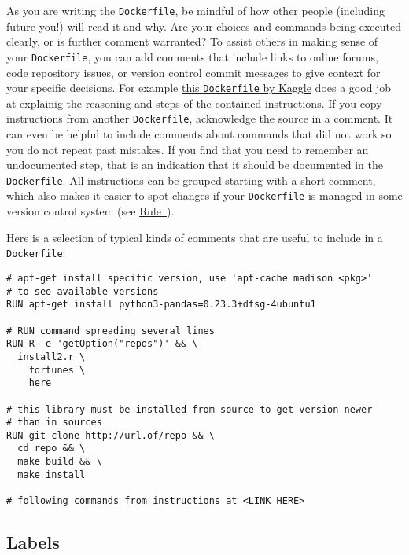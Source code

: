 \documentclass[10pt,letterpaper]{article}
\begin{document}
As you are writing the \texttt{Dockerfile}, be mindful of how other
people (including future you!) will read it and why. Are your choices
and commands being executed clearly, or is further comment warranted? To
assist others in making sense of your \texttt{Dockerfile}, you can add
comments that include links to online forums, code repository issues, or
version control commit messages to give context for your specific
decisions. For example
\href{https://github.com/Kaggle/docker-rstats/blob/master/Dockerfile}{this
\texttt{Dockerfile} by Kaggle} does a good job at explainig the
reasoning and steps of the contained instructions. If you copy
instructions from another \texttt{Dockerfile}, acknowledge the source in
a comment. It can even be helpful to include comments about commands
that did not work so you do not repeat past mistakes. If you find that
you need to remember an undocumented step, that is an indication that it
should be documented in the \texttt{Dockerfile}. All instructions can be
grouped starting with a short comment, which also makes it easier to
spot changes if your \texttt{Dockerfile} is managed in some version
control system (see
\hyperref[{rule:publish}]{Rule~}).

Here is a selection of typical kinds of comments that are useful to
include in a \texttt{Dockerfile}:

\begin{verbatim}
# apt-get install specific version, use 'apt-cache madison <pkg>' 
# to see available versions
RUN apt-get install python3-pandas=0.23.3+dfsg-4ubuntu1

# RUN command spreading several lines
RUN R -e 'getOption("repos")' && \
  install2.r \
    fortunes \
    here

# this library must be installed from source to get version newer
# than in sources
RUN git clone http://url.of/repo && \
  cd repo && \
  make build && \
  make install

# following commands from instructions at <LINK HERE>
\end{verbatim}

\hypertarget{labels}{%
\subsection{Labels}\label{labels}}
\end{document}
